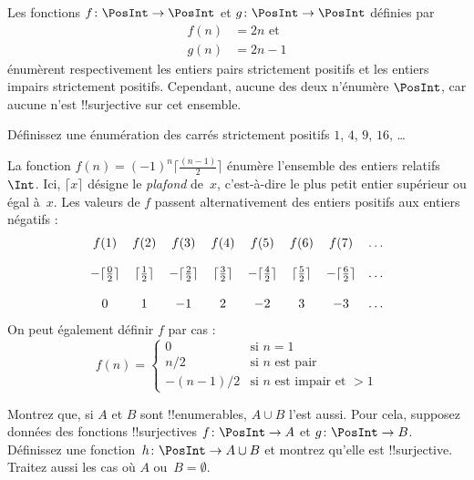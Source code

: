 \documentclass[../../../include/open-logic-section]{subfiles}
\begin{document}
\begin{ex}
Les fonctions $f\colon \PosInt \to \PosInt$ et
$g \colon \PosInt \to \PosInt$ définies par
\begin{align*}
f(n) & = 2n \text{ et}\\
g(n) & = 2n - 1
\end{align*}
énumèrent respectivement les entiers pairs strictement positifs et
les entiers impairs strictement positifs. Cependant, aucune des deux
n’énumère $\PosInt$, car aucune n’est !!{surjective} sur cet ensemble.
\end{ex}

\begin{prob}
Définissez une énumération des carrés strictement positifs
$1$, $4$, $9$, $16$, \dots
\end{prob}

\begin{ex}
La fonction $f(n) = (-1)^{n} \lceil \frac{(n-1)}{2}\rceil$ énumère
l’ensemble des entiers relatifs~$\Int$. Ici, $\lceil x \rceil$ désigne
le \emph{plafond} de~$x$, c’est-à-dire le plus petit entier supérieur
ou égal à~$x$. Les valeurs de $f$ passent alternativement des entiers
positifs aux entiers négatifs :
\[
\begin{array}{c c c c c c c c}
f(1) & f(2) & f(3) & f(4) & f(5) & f(6) & f(7) & \dots \\ \\
- \lceil \tfrac{0}{2} \rceil & \lceil \tfrac{1}{2}\rceil & - \lceil \tfrac{2}{2} \rceil & \lceil \tfrac{3}{2} \rceil & - \lceil \tfrac{4}{2} \rceil  & \lceil \tfrac{5}{2}
\rceil & - \lceil \tfrac{6}{2} \rceil & \dots \\ \\
0 & 1 & -1 & 2 & -2 & 3 & -3 & \dots
\end{array}
\]
%
%
On peut également définir $f$ par cas :
\[
f(n) = \begin{cases}
  0 & \text{si $n = 1$}\\
  n/2 & \text{si $n$ est pair}\\
  -(n-1)/2 & \text{si $n$ est impair et $>1$}
  \end{cases}
\]
\end{ex}

\begin{prob}
Montrez que, si $A$ et $B$ sont !!{enumerable}s, $A \cup B$ l’est aussi.
Pour cela, supposez données des fonctions !!{surjective}s
$f\colon \PosInt \to A$ et $g\colon \PosInt \to B$. Définissez une
fonction~$h\colon \PosInt \to A \cup B$ et montrez qu’elle est
!!{surjective}. Traitez aussi les cas où $A$ ou~$B = \emptyset$.
\end{prob}
\end{document}
